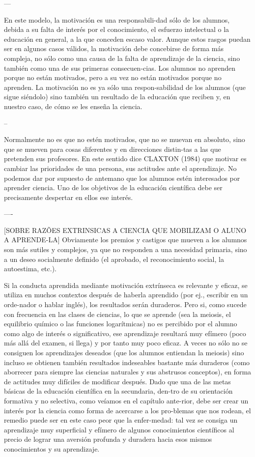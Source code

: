 ---

En este modelo, la motivación es una responsabili-dad sólo de los alumnos, debida a su falta de interés por el conocimiento, el esfuerzo intelectual o la educación en general, a la que conceden escaso valor. Aunque estos rasgos puedan ser en algunos casos válidos, la motivación debe concebirse de forma más compleja, no sólo como una causa de la falta de aprendizaje de la ciencia, sino también como una de sus primeras consecuen-cias. Los alumnos no aprenden porque no están motivados, pero a su vez no están motivados porque no aprenden. La motivación no es ya sólo una respon-sabilidad de los alumnos (que sigue siéndolo) sino también un resultado de la educación que reciben y, en nuestro caso, de cómo se les enseña la ciencia.

--

Normalmente no es que no estén motivados, que no se muevan en absoluto, sino que se mueven para cosas diferentes y en direcciones distin-tas a las que pretenden sus profesores. En este sentido dice CLAXTON (1984) que motivar es cambiar las prioridades de una persona, sus actitudes ante el aprendizaje. No podemos dar por supuesto de antemano que los alumnos estén interesados por aprender ciencia. Uno de los objetivos de la educación científica debe ser precisamente despertar en ellos ese interés.

----

[SOBRE RAZÕES EXTRINSICAS A CIENCIA QUE MOBILIZAM O ALUNO A APRENDE-LA] Obviamente los premios y castigos que mueven a los alumnos son más sutiles y complejos, ya que no responden a una necesidad primaria, sino a un deseo socialmente definido (el aprobado, el reconocimiento social, la autoestima, etc.).

Si la conducta aprendida mediante motivación extrínseca es relevante y eficaz, se utiliza en muchos contextos después de haberla aprendido (por ej., escribir en un orde-nador o hablar inglés), los resultados serán duraderos. Pero si, como sucede con frecuencia en las clases de ciencias, lo que se aprende (sea la meiosis, el equilibrio químico o las funciones logarítmicas) no es percibido por el alumno como algo de interés o significativo, ese aprendizaje resultará muy efímero (poco más allá del examen, si llega) y por tanto muy poco eficaz. A veces no sólo no se consiguen los aprendizajes deseados (que los alumnos entiendan la  meiosis) sino incluso se obtienen también resultados indeseables bastante más duraderos (como aborrecer para siempre las ciencias naturales y sus abstrusos conceptos), en forma de actitudes muy difíciles de modificar después. Dado que una de las metas básicas de la educación científica en la secundaria, den-tro de su orientación formativa y no selectiva, como veíamos en el capítulo ante-rior, debe ser crear un interés por la ciencia como forma de acercarse a los pro-blemas que nos rodean, el remedio puede ser en este caso peor que la enfer-medad: tal vez se consiga un aprendizaje muy superficial y efímero de algunos conocimientos científicos al precio de lograr una aversión profunda y duradera hacia esos mismos conocimientos y su aprendizaje.

